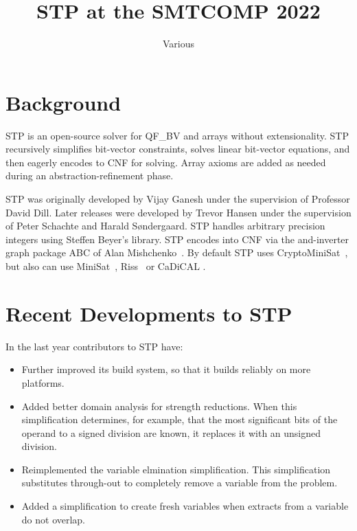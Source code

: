 \documentclass{easychair}
\begin{document}
\title{STP at the SMTCOMP 2022}
\author{Various}
\institute{}

\maketitle
\thispagestyle{empty}
\pagestyle{empty}

\section{Background}
STP\cite{Vijay:Thesis:2007, Trevor:Thesis:2012} is an open-source solver for QF\_BV and arrays without extensionality. 
STP recursively simplifies bit-vector constraints, solves linear bit-vector equations, and then eagerly encodes to CNF for solving. 
Array axioms are added as needed during an abstraction-refinement phase.

STP was originally developed by Vijay Ganesh under the supervision of Professor David Dill. 
Later releases were developed by Trevor Hansen under the supervision of Peter Schachte and Harald Søndergaard. 
STP handles arbitrary precision integers using Steffen Beyer's library. 
STP encodes into CNF via the and-inverter graph package ABC of Alan Mishchenko~\cite{Brayton:2010:AAI:2144310.2144317}.
By default STP uses CryptoMiniSat~\cite{CMS:github}, but also can use MiniSat~\cite{MiniSat:github}, Riss~\cite{Riss:github} or CaDiCAL \cite{cadical}.

\section{Recent Developments to STP}
In the last year contributors to STP have:
\begin{itemize}
\item {Further improved its build system, so that it builds reliably on more platforms.}
\item {Added better domain analysis for strength reductions. When this simplification determines, for example, that the most significant bits of the operand to a signed division are known, it replaces it with an unsigned division.}
\item {Reimplemented the variable elmination simplification. This simplification substitutes through-out to completely remove a variable from the problem. }
\item {Added a simplification to create fresh variables when extracts from a variable do not overlap.}
\end{itemize}
\end{document}
